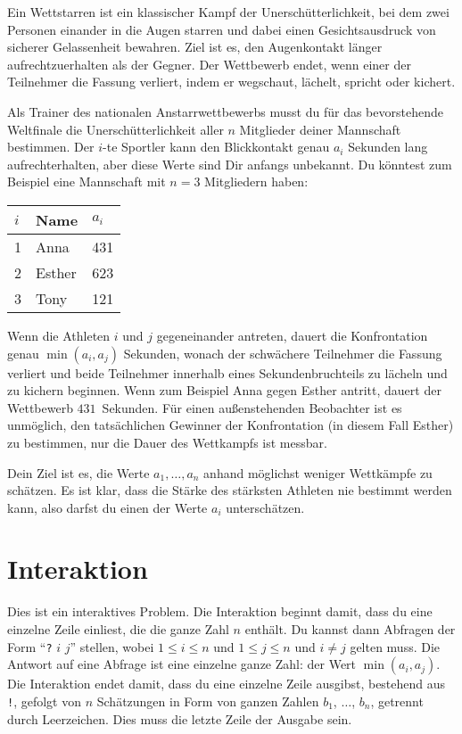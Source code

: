 

\noindent
Ein Wettstarren ist ein klassischer Kampf der Unerschütterlichkeit, bei dem zwei Personen einander in die Augen starren und dabei einen Gesichtsausdruck von sicherer Gelassenheit bewahren.
Ziel ist es, den Augenkontakt länger aufrechtzuerhalten als der Gegner.
Der Wettbewerb endet, wenn einer der Teilnehmer die Fassung verliert, indem er wegschaut, lächelt, spricht oder kichert.

Als Trainer des nationalen Anstarrwettbewerbs musst du für das bevorstehende Weltfinale die Unerschütterlichkeit aller $n$ Mitglieder deiner Mannschaft bestimmen.
Der $i$-te Sportler kann den Blickkontakt genau $a_i$ Sekunden lang aufrechterhalten, aber diese Werte sind Dir anfangs unbekannt.
Du könntest zum Beispiel eine Mannschaft mit $n=3$ Mitgliedern haben:

\medskip
\begin{tabular}{lll}
  $i$ & Name & $a_i$\\\hline
  1 & Anna &  431 \\
  2 & Esther & 623 \\
  3 & Tony &  121\\
\end{tabular}

\medskip
Wenn die Athleten $i$ und $j$ gegeneinander antreten, dauert die Konfrontation genau $\min(a_i, a_j)$ Sekunden, wonach der schwächere Teilnehmer die Fassung verliert und beide Teilnehmer innerhalb eines Sekundenbruchteils zu lächeln und zu kichern beginnen.
Wenn zum Beispiel Anna gegen Esther antritt, dauert der Wettbewerb $431$~Sekunden.
Für einen außenstehenden Beobachter ist es unmöglich, den tatsächlichen Gewinner der Konfrontation (in diesem Fall Esther) zu bestimmen, nur die Dauer des Wettkampfs ist messbar.

Dein Ziel ist es, die Werte $a_1,\ldots, a_n$ anhand möglichst weniger Wettkämpfe zu schätzen.
Es ist klar, dass die Stärke des stärksten Athleten nie bestimmt werden kann, also darfst du einen der Werte $a_i$ unterschätzen.

\section*{Interaktion}

Dies ist ein interaktives Problem.
Die Interaktion beginnt damit, dass du eine einzelne Zeile einliest, die die ganze Zahl $n$ enthält.
Du kannst dann Abfragen der Form ``\texttt{?} $i$ $j$'' stellen, wobei $1\leq i\leq n$ und $1\leq j\leq n$ und $i\neq j$ gelten muss.
Die Antwort auf eine Abfrage ist eine einzelne ganze Zahl: der Wert $\min(a_i, a_j)$.
Die Interaktion endet damit, dass du eine einzelne Zeile ausgibst, bestehend aus \texttt{!}, gefolgt von $n$ Schätzungen in Form von ganzen Zahlen $b_1$, $\ldots$, $b_n$, getrennt durch Leerzeichen.
Dies muss die letzte Zeile der Ausgabe sein.


